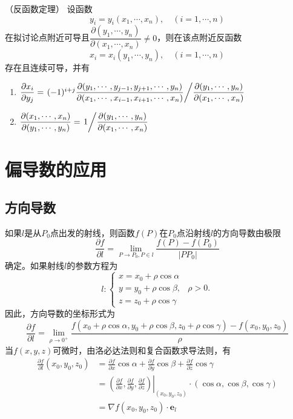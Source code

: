 \begin{theorem}
    （反函数定理）
    \label{th:反函数定理}
    设函数
    \[ y_i=y_i(x_1,\cdots,x_n),\quad (i=1,\cdots,n) \]
    在拟讨论点附近可导且$\dfrac{\partial(y_1,\cdots,y_n)}{\partial(x_1,\cdots,x_n)}\neq 0$，则在该点附近反函数
    \[ x_i = x_i(y_1,\cdots,y_n),\quad (i=1,\cdots,n) \]
    存在且连续可导，并有
    \begin{enumerate}[(1)]
        \item
              $
                  \dfrac{\partial x_i}{\partial y_j}
                  = \left.(-1)^{i+j} \dfrac{\partial(y_1,\cdots,y_{j-1},y_{j+1},\cdots,y_n)}{\partial(x_1,\cdots,x_{i-1},x_{i+1},\cdots,x_n)}
                  \middle/
                  \dfrac{\partial(y_1,\cdots,y_n)}{\partial(x_1,\cdots,x_n)}
                  \right.
              $
        \item
              $
                  \dfrac{\partial(x_1,\cdots,x_n)}{\partial(y_1,\cdots,y_n)} = \left.1\middle/\dfrac{\partial(y_1,\cdots,y_n)}{\partial(x_1,\cdots,x_n)}\right.
              $
    \end{enumerate}
\end{theorem}

\section{偏导数的应用}
\subsection{方向导数}
如果$l$是从$P_0$点出发的射线，则函数$f(P)$在$P_0$点沿射线$l$的方向导数由极限
\begin{equation}
    \frac{\partial f}{\partial l} = \lim_{P\to P_0,P\in l}\frac{f(P)-f(P_0)}{|PP_0|}
\end{equation}
确定。如果射线$l$的参数方程为
\[
    l:
    \begin{cases}
        x = x_0 + \rho\cos\alpha &          \\
        y = y_0 + \rho\cos\beta, & \rho >0. \\
        z = z_0 + \rho\cos\gamma &
    \end{cases}
\]
因此，方向导数的坐标形式为
\begin{equation}
    \frac{\partial f}{\partial l} = \lim_{\rho\to 0^+}\frac{f(x_0 + \rho\cos\alpha,y_0 + \rho\cos\beta,z_0 + \rho\cos\gamma)-f(x_0,y_0,z_0)}{\rho}
\end{equation}
当$f(x,y,z)$可微时，由洛必达法则和复合函数求导法则，有
\begin{align*}
    \frac{\partial f}{\partial l}(x_0,y_0,z_0)
     & = \frac{\partial f}{\partial x}\cos\alpha + \frac{\partial f}{\partial y}\cos\beta + \frac{\partial f}{\partial z}\cos\gamma                                                \\
     & = \left.\left(\frac{\partial f}{\partial x},\frac{\partial f}{\partial y},\frac{\partial f}{\partial z}\right)\right|_{(x_0,y_0,z_0)}\cdot(\cos\alpha,\cos\beta,\cos\gamma) \\
     & = \nabla f(x_0,y_0,z_0)\cdot \bm{e}_l
\end{align*}

